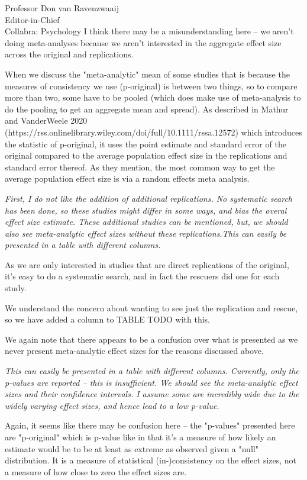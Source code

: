 \documentclass{stanfordletter}
\newcommand{\theysaid}[1]{\begin{leftbar} \noindent 
		\textsl{ #1}\end{leftbar}}
\begin{document}
\begin{letter}{Professor Don van Ravenzwaaij \\ Editor-in-Chief \\ Collabra: Psychology }
		I think there may be a misunderstanding here -- we aren't doing meta-analyses because we aren't interested in the aggregate effect size across the original and replications. 
		
		When we discuss the "meta-analytic" mean of some studies that is because the measures of consistency we use (p-original) is between two things, so to compare more than two, some have to be pooled (which does make use of meta-analysis to do the pooling to get an aggregate mean and spread). As described in Mathur and VanderWeele 2020 (https://rss.onlinelibrary.wiley.com/doi/full/10.1111/rssa.12572) which introduces the statistic of p-original, it uses the point estimate and standard error of the original compared to the average population effect size in the replications and standard error thereof. As they mention, the most common way to get the average population effect size is via a random effects meta analysis. 
		
		\theysaid{ First, I do not like the addition of additional replications. No systematic search has been done, so these studies might differ in some ways, and bias the overal effect size estimate. These additional studies can be mentioned, but, we should also see meta-analytic effect sizes without these replications.This can easily be presented in a table with different columns.}
		
		As we are only interested in studies that are direct replications of the original, it's easy to do a systematic search, and in fact the rescuers did one for each study. 
		
		We understand the concern about wanting to see just the replication and rescue, so we have added a column to TABLE TODO with this. 
		
		We again note that there appears to be a confusion over what is presented as we never present meta-analytic effect sizes for the reasons discussed above. 
		
		 \theysaid{This can easily be presented in a table with different columns. Currently, only the p-values are reported – this is insufficient. We should see the meta-analytic effect sizes and their confidence intervals. I assume some are incredibly wide due to the widely varying effect sizes, and hence lead to a low p-value.}
		 
		 Again, it seems like there may be confusion here -- the "p-values" presented here are "p-original" which is p-value like in that it's a measure of how likely an estimate would be to be at least as extreme as observed given a "null" distribution. It is a measure of statistical (in-)consistency on the effect sizes, not a measure of how close to zero the effect sizes are. 
		 

\end{letter}
\end{document}
